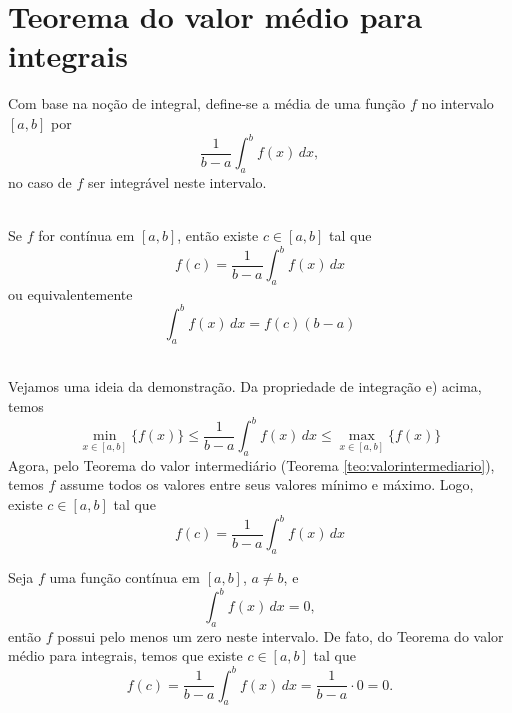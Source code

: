 \cleardoublepage\documentclass[../main.tex]{subfiles}
\begin{document}
\section{Teorema do valor médio para integrais}\hypertarget{TVI}{}
Com base na noção de integral, define-se a média de uma função $f$ no intervalo $[a, b]$ por
\begin{equation}
  \frac{1}{b-a}\int_a^b f(x)\,dx,
\end{equation}
no caso de $f$ ser integrável neste intervalo.

\begin{framed}
\begin{teo}~\label{teo:int_teomed}
\\  Se $f$ for contínua em $[a, b]$, então existe $c\in [a, b]$ tal que
  \begin{equation}
    f(c) = \frac{1}{b-a}\int_a^b f(x)\,dx
  \end{equation}
  ou equivalentemente
  \begin{equation}
       \int_a^b f(x)\,dx=f(c) (b-a)
  \end{equation}
\end{teo}
\begin{framed}
\begin{dem}~
 \\ Vejamos uma ideia da demonstração. Da propriedade de integração e) acima, temos
  \begin{equation*}
    \min_{x\in [a, b]} \{f(x)\} \leq \frac{1}{b-a}\int_a^b f(x)\,dx \leq \max_{x\in [a, b]} \{f(x)\}
  \end{equation*}
  Agora, pelo Teorema do valor intermediário (Teorema \ref{teo:valorintermediario}), temos $f$ assume todos os valores entre seus valores mínimo e máximo. Logo, existe $c\in [a, b]$ tal que
  \begin{equation*}
    f(c) = \frac{1}{b-a}\int_a^b f(x)\,dx
  \end{equation*}  
\end{dem}\end{framed}\end{framed}
\begin{ex}
  Seja $f$ uma função contínua em $[a, b]$, $a\neq b$, e
  \begin{equation*}
    \int_a^b f(x)\,dx = 0,
  \end{equation*}
  então $f$ possui pelo menos um zero neste intervalo. De fato, do Teorema do valor médio para integrais, temos que existe $c\in [a, b]$ tal que
  \begin{equation*}
    f(c) = \frac{1}{b-a}\int_a^b f(x)\,dx = \frac{1}{b-a}\cdot 0 = 0.
  \end{equation*}
\end{ex}
\end{document}
